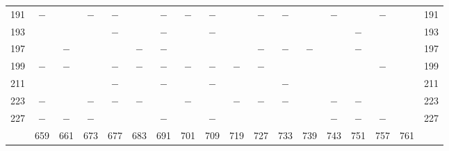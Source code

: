\begin{center}
\begin{tabular}{r|c|c|c|c|c|c|c|c|c|c|c|c|c|c|c|c|r}
191 & $-$ &  & $-$ & $-$ &  & $-$ & $-$ & $-$ &  & $-$ & $-$ &  & $-$ &  & $-$ &  & 191\\
193 &  &  &  & $-$ &  & $-$ &  & $-$ &  &  &  &  &  & $-$ &  &  & 193\\
197 &  & $-$ &  &  & $-$ & $-$ &  &  &  & $-$ & $-$ & $-$ &  & $-$ &  &  & 197\\
199 & $-$ & $-$ &  & $-$ & $-$ & $-$ & $-$ & $-$ & $-$ & $-$ &  &  &  &  & $-$ &  & 199\\
211 &  &  &  & $-$ &  & $-$ &  & $-$ &  &  & $-$ &  &  &  &  &  & 211\\
223 & $-$ &  & $-$ & $-$ & $-$ &  & $-$ &  & $-$ & $-$ & $-$ &  & $-$ & $-$ &  &  & 223\\
227 & $-$ & $-$ & $-$ &  &  & $-$ &  & $-$ &  &  &  &  & $-$ & $-$ & $-$ &  & 227\\
\hline
 & 659 & 661 & 673 & 677 & 683 & 691 & 701 & 709 & 719 & 727 & 733 & 739 & 743 & 751 & 757 & 761 & \\
\hline
\end{tabular}\endgroup\end{center}

